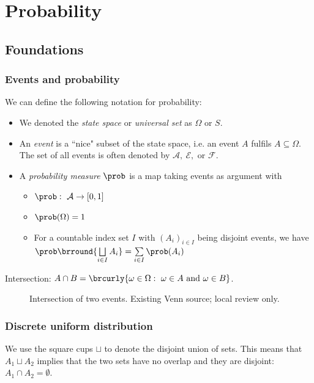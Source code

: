 \section{Probability}
\subsection{Foundations}\label{sec:foundations}
\subsubsection{Events and probability}
\begin{definition}\label{def:probability}
We can define the following notation for probability:
\begin{itemize}
    \item We denoted the \textit{state space} or \textit{universal set} as $\Omega$ or $S$.
    \item An \textit{event} is a ``nice" subset of the state space, i.e. an event $A$ fulfils $A\subseteq\Omega$. The set of all events is often denoted by $\mathcal{A},\ \mathcal{E},$ or $\mathcal{F}$.
    \item A \textit{probability measure} $\prob$ is a map taking events as argument with
    \begin{itemize}
        \item $\prob:\ \mathcal{A}\to[0,1]$
        \item $\prob(\Omega)=1$
        \item For a countable index set $I$ with $(A_i)_{i\in I}$ being disjoint events, we have $\prob\brround{\bigsqcup\limits_{i\in I}A_i}=\sum\limits_{i\in I}\prob(A_i)$
    \end{itemize}
\end{itemize}
\end{definition}
Intersection: $A\cap B=\brcurly{\omega\in\Omega:\ \omega\in A\text{ and }\omega\in B}$.
\begin{figure}[htbp]
\centering

\caption{Intersection of two events. Existing Venn source; local review only.}\label{fig:intersection}
\end{figure}
\subsubsection{Discrete uniform distribution}
We use the square cups $\sqcup$ to denote the disjoint union of sets. This means that $A_1\sqcup A_2$ implies that the two sets have no overlap and they are disjoint: $A_1\cap A_2=\emptyset$.

